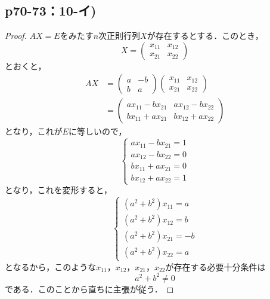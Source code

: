 \documentclass[uplatex,dvipdfmx,a4paper,11pt,fleqn]{jsarticle}
\begin{document}
\newpage 


\subsection*{p70-73：10-イ)}

\begin{tleftbar}
    \begin{proof}
    $AX=E$をみたす$n$次正則行列$X$が存在するとする．このとき，
    \[
        X = \begin{pmatrix} x_{11} & x_{12} \\ x_{21} & x_{22} \end{pmatrix}
    \]
    とおくと，
    \begin{align*}
        AX & = \begin{pmatrix} a & -b \\ b & a \end{pmatrix} \begin{pmatrix} x_{11} & x_{12} \\ x_{21} & x_{22} \end{pmatrix} \\
        & = \begin{pmatrix} ax_{11}-bx_{21} & ax_{12}-bx_{22} \\ bx_{11}+ax_{21} & bx_{12}+ax_{22} \end{pmatrix}
    \end{align*} 
    となり，これが$E$に等しいので，
    \[
        \begin{cases} 
            ax_{11}-bx_{21} =1 \\
            ax_{12}-bx_{22} =0 \\
            bx_{11}+ax_{21} =0 \\
            bx_{12}+ax_{22} =1
        \end{cases}
    \]
    となり，これを変形すると，
    \[
        \begin{cases} 
            (a^2+b^2) x_{11} = a \\
            (a^2+b^2) x_{12} = b \\
            (a^2+b^2) x_{21}=-b \\
            (a^2+b^2) x_{22} = a
        \end{cases}
    \]
    となるから，このような$x_{11}$，$x_{12}$，$x_{21}$，$x_{22}$が存在する必要十分条件は
    \[
    a^2 + b^2 \ne 0
    \]
    である．このことから直ちに主張が従う．
    \end{proof}
\end{tleftbar}
\end{document}
